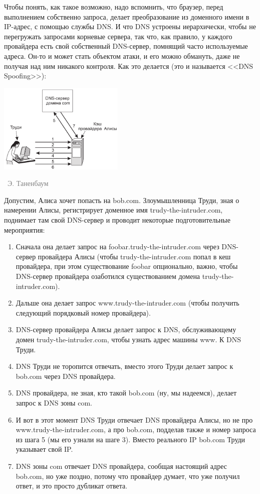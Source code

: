 \documentclass[a5paper]{article}
\newcommand{\attribution}[1] {
\vspace{-5mm}\begin{flushright}\begin{scriptsize}\textcolor{gray}{\textcopyright\, #1}\end{scriptsize}\end{flushright}
}
\begin{document}
Чтобы понять, как такое возможно, надо вспомнить, что браузер, перед выполнением собственно запроса, делает преобразование из доменного имени в IP-адрес, с помощью службы DNS. И что DNS устроены иерархически, чтобы не перегружать запросами корневые сервера, так что, как правило, у каждого провайдера есть свой собственный DNS-сервер, помнящий часто используемые адреса. Он-то и может стать объектом атаки, и его можно обмануть, даже не получая над ним никакого контроля. Как это делается (это и называется <<DNS Spoofing>>):

\begin{center}
    \includegraphics[width=0.45\textwidth]{dnsSpoofing.png}
    \attribution{Э. Таненбаум}
\end{center}

Допустим, Алиса хочет попасть на bob.com. Злоумышленница Труди, зная о намерении Алисы, регистрирует доменное имя trudy-the-intruder.com, поднимает там свой DNS-сервер и проводит некоторые подготовительные мероприятия: 

\begin{enumerate}
    \item Сначала она делает запрос на foobar.trudy-the-intruder.com через DNS-сервер провайдера Алисы (чтобы trudy-the-intruder.com попал в кеш провайдера, при этом существование foobar опционально, важно, чтобы DNS-сервер провайдера озаботился существованием домена trudy-the-intruder.com).
    \item Дальше она делает запрос www.trudy-the-intruder.com (чтобы получить следующий порядковый номер провайдера).
    \item DNS-сервер провайдера Алисы делает запрос к DNS, обслуживающему домен trudy-the-intruder.com, чтобы узнать адрес машины www. К DNS Труди.
    \item DNS Труди не торопится отвечать, вместо этого Труди делает запрос к bob.com через DNS провайдера.
    \item DNS провайдера, не зная, кто такой bob.com (ну, мы надеемся), делает запрос к DNS зоны com.
    \item И вот в этот момент DNS Труди отвечает DNS провайдера Алисы, но не про www.trudy-the-intruder.com, а про bob.com, подделав также и номер запроса из шага 5 (мы его узнали на шаге 3). Вместо реального IP bob.com Труди указывает свой IP.
    \item DNS зоны com отвечает DNS провайдера, сообщая настоящий адрес bob.com, но уже поздно, потому что провайдер думает, что уже получил ответ, и это просто дубликат ответа.
\end{enumerate}
\end{document}
